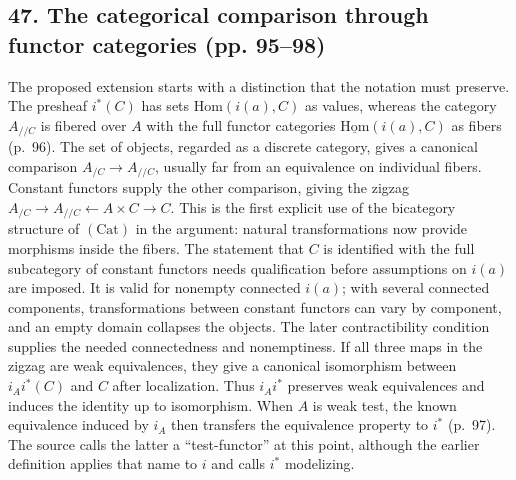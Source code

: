 \subsection*{47. The categorical comparison through functor categories (pp. 95--98)}
The proposed extension starts with a distinction that the notation must preserve. The presheaf $i^*(C)$ has sets $\mathrm{Hom}(i(a),C)$ as values, whereas the category $A_{//C}$ is fibered over $A$ with the full functor categories $\underline{\mathrm{Hom}}(i(a),C)$ as fibers (p.~96). The set of objects, regarded as a discrete category, gives a canonical comparison $A_{/C}\to A_{//C}$, usually far from an equivalence on individual fibers. Constant functors supply the other comparison, giving the zigzag $A_{/C}\to A_{//C}\leftarrow A\times C\to C$. This is the first explicit use of the bicategory structure of $(\mathrm{Cat})$ in the argument: natural transformations now provide morphisms inside the fibers. The statement that $C$ is identified with the full subcategory of constant functors needs qualification before assumptions on $i(a)$ are imposed. It is valid for nonempty connected $i(a)$; with several connected components, transformations between constant functors can vary by component, and an empty domain collapses the objects. The later contractibility condition supplies the needed connectedness and nonemptiness. If all three maps in the zigzag are weak equivalences, they give a canonical isomorphism between $i_Ai^*(C)$ and $C$ after localization. Thus $i_Ai^*$ preserves weak equivalences and induces the identity up to isomorphism. When $A$ is weak test, the known equivalence induced by $i_A$ then transfers the equivalence property to $i^*$ (p.~97). The source calls the latter a ``test-functor'' at this point, although the earlier definition applies that name to $i$ and calls $i^*$ modelizing.

